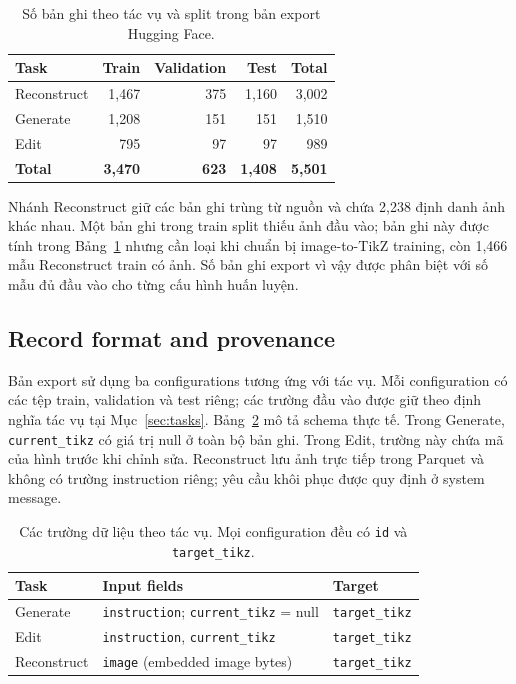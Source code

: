 \documentclass[a4paper,12pt]{article}
\begin{document}
\begin{table}[tbp]
\centering
\caption[Dataset size by task and split]{Số bản ghi theo tác vụ và split trong bản export Hugging Face.}
\label{tab:dataset-splits}
\begin{tabular}{lrrrr}
\toprule
\textbf{Task} & \textbf{Train} & \textbf{Validation} & \textbf{Test} & \textbf{Total}\\
\midrule
Reconstruct & 1,467 & 375 & 1,160 & 3,002\\
Generate & 1,208 & 151 & 151 & 1,510\\
Edit & 795 & 97 & 97 & 989\\
\midrule
\textbf{Total} & \textbf{3,470} & \textbf{623} & \textbf{1,408} & \textbf{5,501}\\
\bottomrule
\end{tabular}
\end{table}

Nhánh Reconstruct giữ các bản ghi trùng từ nguồn và chứa 2,238 định danh ảnh khác nhau. Một bản ghi trong train split thiếu ảnh đầu vào; bản ghi này được tính trong Bảng~\ref{tab:dataset-splits} nhưng cần loại khi chuẩn bị image-to-TikZ training, còn 1,466 mẫu Reconstruct train có ảnh. Số bản ghi export vì vậy được phân biệt với số mẫu đủ đầu vào cho từng cấu hình huấn luyện.

\subsection{Record format and provenance}
Bản export sử dụng ba configurations tương ứng với tác vụ. Mỗi configuration có các tệp train, validation và test riêng; các trường đầu vào được giữ theo định nghĩa tác vụ tại Mục~\ref{sec:tasks}. Bảng~\ref{tab:dataset-fields} mô tả schema thực tế. Trong Generate, \texttt{current\_tikz} có giá trị null ở toàn bộ bản ghi. Trong Edit, trường này chứa mã của hình trước khi chỉnh sửa. Reconstruct lưu ảnh trực tiếp trong Parquet và không có trường instruction riêng; yêu cầu khôi phục được quy định ở system message.

\begin{table}[tbp]
\centering
\caption[Task-specific fields in the dataset export]{Các trường dữ liệu theo tác vụ. Mọi configuration đều có \texttt{id} và \texttt{target\_tikz}.}
\label{tab:dataset-fields}
\begin{tabularx}{\linewidth}{lXX}
\toprule
\textbf{Task} & \textbf{Input fields} & \textbf{Target}\\
\midrule
Generate & \texttt{instruction}; \texttt{current\_tikz} = null & \texttt{target\_tikz}\\
Edit & \texttt{instruction}, \texttt{current\_tikz} & \texttt{target\_tikz}\\
Reconstruct & \texttt{image} (embedded image bytes) & \texttt{target\_tikz}\\
\bottomrule
\end{tabularx}
\end{table}
\end{document}
